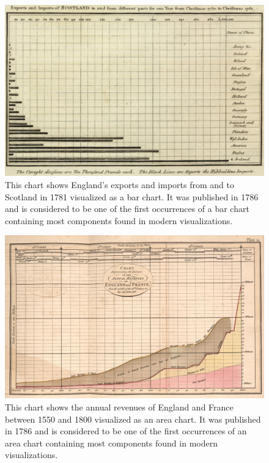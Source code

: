 \begin{figure}[tp]
\centering
\includegraphics[keepaspectratio,width=\linewidth,height=\fullh / 3]{images/playfair-bar-chart.png}
\caption[Bar Chart by William Playfair from 1786]{
  This chart shows England's exports and imports from and to Scotland in 1781 visualized as a bar chart.
  It was published in 1786 and is considered to be one of the first occurrences of a bar chart containing most components found in modern visualizations.
}
\label{fig:PlayfairBarChart}
\end{figure}

\begin{figure}[tp]
\centering
\includegraphics[keepaspectratio,width=\linewidth,height=\fullh / 3]{images/playfair-area-chart.png}
\caption[Area Chart by William Playfair from 1786]{
  This chart shows the annual revenues of England and France between 1550 and 1800 visualized as an area chart.
  It was published in 1786 and is considered to be one of the first occurrences of an area chart containing most components found in modern visualizations.
}
\label{fig:PlayfairAreaChart}
\end{figure}

